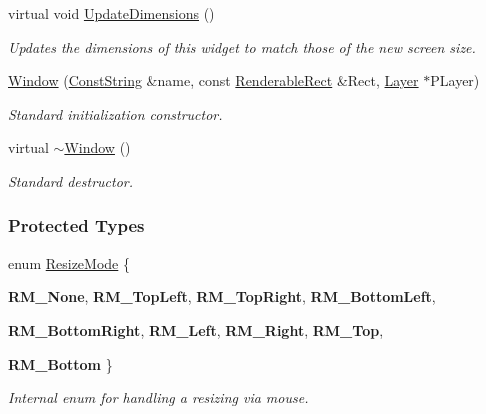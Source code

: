 \begin{DoxyCompactItemize}
virtual void \hyperlink{classMezzanine_1_1UI_1_1Window_a793c156e8de19f44b8c132b05ed4f7b6}{UpdateDimensions} ()
\begin{DoxyCompactList}\small\item\em Updates the dimensions of this widget to match those of the new screen size. \item\end{DoxyCompactList}\item 
\hyperlink{classMezzanine_1_1UI_1_1Window_a3195ffbbdf76bc22ff626739872caf37}{Window} (\hyperlink{namespaceMezzanine_a63cd699ac54b73953f35ec9cfc05e506}{ConstString} \&name, const \hyperlink{structMezzanine_1_1UI_1_1RenderableRect}{RenderableRect} \&Rect, \hyperlink{classMezzanine_1_1UI_1_1Layer}{Layer} $\ast$PLayer)
\begin{DoxyCompactList}\small\item\em Standard initialization constructor. \item\end{DoxyCompactList}\item 
\hypertarget{classMezzanine_1_1UI_1_1Window_a5e40510a0ee0e248e6ea8526a88e6974}{
virtual \hyperlink{classMezzanine_1_1UI_1_1Window_a5e40510a0ee0e248e6ea8526a88e6974}{$\sim$Window} ()}
\label{classMezzanine_1_1UI_1_1Window_a5e40510a0ee0e248e6ea8526a88e6974}

\begin{DoxyCompactList}\small\item\em Standard destructor. \item\end{DoxyCompactList}\end{DoxyCompactItemize}
\subsubsection*{Protected Types}
\begin{DoxyCompactItemize}
\item 
enum \hyperlink{classMezzanine_1_1UI_1_1Window_af42e3712bea229089f8c7ccae8bd53f2}{ResizeMode} \{ \par
{\bfseries RM\_\-None}, 
{\bfseries RM\_\-TopLeft}, 
{\bfseries RM\_\-TopRight}, 
{\bfseries RM\_\-BottomLeft}, 
\par
{\bfseries RM\_\-BottomRight}, 
{\bfseries RM\_\-Left}, 
{\bfseries RM\_\-Right}, 
{\bfseries RM\_\-Top}, 
\par
{\bfseries RM\_\-Bottom}
 \}
\begin{DoxyCompactList}\small\item\em Internal enum for handling a resizing via mouse. \item\end{DoxyCompactList}\end{DoxyCompactItemize}
